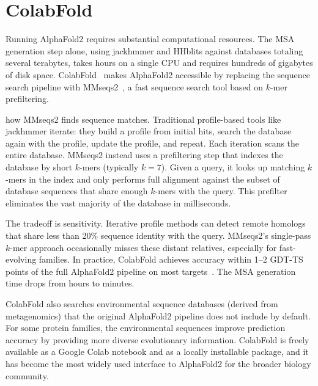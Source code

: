 \section{ColabFold}
\label{sec:af2-colabfold}

Running AlphaFold2 requires substantial computational resources.
The MSA generation step alone, using jackhmmer and HHblits against databases totaling several terabytes, takes hours on a single CPU and requires hundreds of gigabytes of disk space.
ColabFold~\cite{mirdita2022} makes AlphaFold2 accessible by replacing the sequence search pipeline with MMseqs2~\cite{steinegger2017}, a fast sequence search tool based on $k$-mer prefiltering.

 how MMseqs2 finds sequence matches.
Traditional profile-based tools like jackhmmer iterate: they build a profile from initial hits, search the database again with the profile, update the profile, and repeat.
Each iteration scans the entire database.
MMseqs2 instead uses a prefiltering step that indexes the database by short $k$-mers (typically $k = 7$).
Given a query, it looks up matching $k$-mers in the index and only performs full alignment against the subset of database sequences that share enough $k$-mers with the query.
This prefilter eliminates the vast majority of the database in milliseconds.

The tradeoff is sensitivity.
Iterative profile methods can detect remote homologs that share less than 20\% sequence identity with the query.
MMseqs2's single-pass $k$-mer approach occasionally misses these distant relatives, especially for fast-evolving families.
In practice, ColabFold achieves accuracy within 1--2 GDT-TS points of the full AlphaFold2 pipeline on most targets~\cite{mirdita2022}.
The MSA generation time drops from hours to minutes.

ColabFold also searches environmental sequence databases (derived from metagenomics) that the original AlphaFold2 pipeline does not include by default.
For some protein families, the environmental sequences improve prediction accuracy by providing more diverse evolutionary information.
ColabFold is freely available as a Google Colab notebook and as a locally installable package, and it has become the most widely used interface to AlphaFold2 for the broader biology community.


